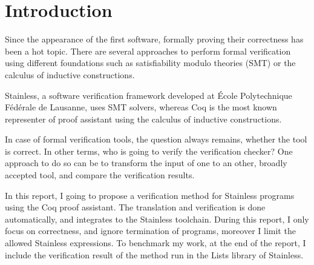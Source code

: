 \section{Introduction}
\label{sec:introduction}

Since the appearance of the first software, formally proving their correctness has been a hot topic. There are several approaches to perform formal verification using different foundations such as satisfiability modulo theories (SMT) or the calculus of inductive constructions.

Stainless, a software verification framework developed at École Polytechnique Fédérale de Lausanne, uses SMT solvers, whereas Coq is the most known representer of proof assistant using the calculus of inductive constructions.

In case of formal verification tools, the question always remains, whether the tool is correct. In other terms, who is going to verify the verification checker? One approach to do so can be to transform the input of one to an other, broadly accepted tool, and compare the verification results. 

In this report, I going to propose a verification method for Stainless programs using the Coq proof assistant. The translation and verification is done automatically, and integrates to the Stainless toolchain. During this report, I only focus on correctness, and ignore termination of programs, moreover I limit the allowed Stainless expressions. To benchmark my work, at the end of the report, I include the verification result of the method run in the Lists library of Stainless.